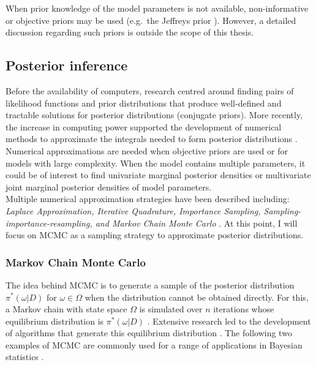 When prior knowledge of the model parameters is not available, non-informative or objective priors may be used (e.g.~the Jeffreys prior \citep{Jeffreys1946}). However, a detailed discussion regarding such priors is outside the scope of this thesis.

\newpage

\subsection{Posterior inference} \label{sec0:posterior_inference}

Before the availability of computers, research centred around finding pairs of likelihood functions and prior distributions that produce well-defined and tractable solutions for posterior distributions (conjugate priors). More recently, the increase in computing power supported the development of numerical methods to approximate the integrals needed to form posterior distributions \citep{Fink1997}. Numerical approximations are needed when objective priors are used or for models with large complexity. When the model contains multiple parameters, it could be of interest to find univariate marginal posterior densities or multivariate joint marginal posterior densities of model parameters.\\

Multiple numerical approximation strategies have been described including: \emph{Laplace Approximation, Iterative Quadrature, Importance Sampling, Sampling-importance-resampling, and Markov Chain Monte Carlo} \citep{Bernardo2000}. At this point, I will focus on \gls{MCMC} \citep{Metropolis1953, Hastings1970} as a sampling strategy to approximate posterior distributions.

\subsubsection{Markov Chain Monte Carlo}

The idea behind MCMC is to generate a sample of the posterior distribution $\pi^*(\omega|D)$ for $\omega\in\Omega$ when the distribution cannot be obtained directly. For this, a Markov chain with state space $\Omega$ is simulated over $n$ iterations whose equilibrium distribution is $\pi^*(\omega|D)$ \citep{Bernardo2000}. Extensive research led to the development of algorithms that generate this equilibrium distribution \citep{Casella1992, Gelfand1990, Greyer1992, Besag1993, Gelman1992}.
The following two examples of MCMC are commonly used for a range of applications in Bayesian statistics \citep{Bernardo2000}.\\


